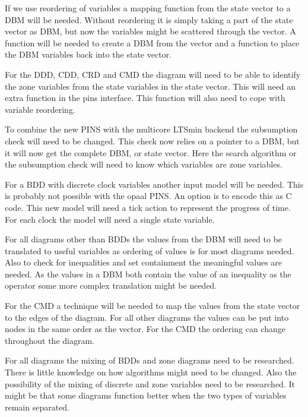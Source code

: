 \documentclass[11pt]{article}
\begin{document}
If we use reordering of variables a mapping function from the state vector to a DBM will be needed. Without reordering it is simply taking a part of the state vector as DBM, but now the variables might be scattered through the vector. A function will be needed to create a DBM from the vector and a function to place the DBM variables back into the state vector.

For the DDD, CDD, CRD and CMD the diagram will need to be able to identify the zone variables from the state variables in the state vector. This will need an extra function in the pins interface. This function will also need to cope with variable reordering. 

To combine the new PINS with the multicore LTSmin backend the subsumption check will need to be changed. This check now relies on a pointer to a DBM, but it will now get the complete DBM, or state vector. Here the search algorithm or the subsumption check will need to know which variables are zone variables.

For a BDD with discrete clock variables another input model will be needed. This is probably not possible with the opaal PINS. An option is to encode this as C code. This new model will need a tick action to represent the progress of time. For each clock the model will need a single state variable. 

For all diagrams other than BDDs the values from the DBM will need to be translated to useful variables as ordering of values is for most diagrams needed. Also to check for inequalities and set containment the meaningful values are needed. As the values in a DBM both contain the value of an inequality as the operator some more complex translation might be needed. 

For the CMD a technique will be needed to map the values from the state vector to the edges of the diagram. For all other diagrams the values can be put into nodes in the same order as the vector. For the CMD the ordering can change throughout the diagram. 

For all diagrams the mixing of BDDs and zone diagrams need to be researched. There is little knowledge on how algorithms might need to be changed. Also the possibility of the mixing of discrete and zone variables need to be researched. It might be that some diagrams function better when the two types of variables remain separated.
{}

\end{document}
